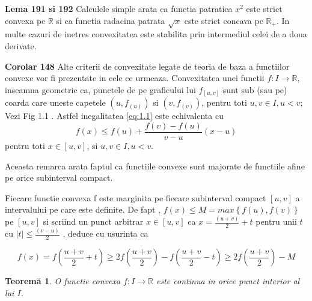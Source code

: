 \documentclass[a4paper,12pt,oneside]{report}
\newtheorem{theorem}{Teorem\u a}
\begin{document}
\textbf{Lema 191 si 192} 
Calculele simple arata ca functia patratica \(x^{2}\) este strict convexa pe \(\mathbb{R}\) si ca functia radacina patrata \(\sqrt{x}\) este strict concava pe \(\mathbb{R}_{+}\). In multe cazuri de inetres convexitatea este stabilita prin intermediul celei de a doua derivate.

\textbf{Corolar 148}
Alte criterii de convexitate legate de teoria de baza a functiilor convexe vor fi prezentate in cele ce urmeaza. 
Convexitatea unei functii \(f : I\rightarrow \mathbb{R}\), inseamna geometric ca, punctele de pe graficului lui \(f_{\left [ u,v \right ]}\) sunt sub (sau pe) coarda care uneste capetele \(\left ( u , f_{\left ( u \right )} \right )\)  si \(\left ( v , f_{\left ( v \right )} \right )\), pentru toti \(u, v \in I, u < v\); 
Vezi Fig 1.1 . Astfel inegalitatea \ref{eq:1.1} este echivalenta cu 
\begin{displaymath}
	f\left ( x \right )\leq f\left ( u \right ) +\frac{f\left ( v \right )- f\left ( u \right )}{v - u}\left ( x - u \right ) \label{eq:1.2} \tag{1.2}
\end{displaymath}
pentru toti \(x\in \left [  u, v\right ]\), si \(u, v \in I, u < v\). 

%
%
%
%

Aceasta remarca arata faptul ca functiile convexe sunt majorate de functiile afine pe orice subinterval compact. 

Fiecare functie convexa f este marginita pe fiecare subinterval compact \(\left [ u , v \right ]\) a intervalului pe care este definite. De fapt , \(f\left ( x \right ) \leq  M = max \left \{ f\left ( u \right ), f\left ( v \right ) \right \}\)  pe \(\left [ u , v \right ]\)  si scriind un punct arbitrar \(x\in  \left [ u , v  \right ]\)  ca  \(x= \frac{\left ( u + v \right )}{2} + t\) pentru unii \(t\) cu \(\left | t \right |\leq \frac{\left ( v - u \right )}{2}\) , deduce cu usurinta ca 

\begin{displaymath}
  f\left ( x \right )=  f\left ( \frac{u+v}{2} + t\right )\geq 2 f\left ( \frac{u + v}{2} \right )- f\left ( \frac{u + v}{2} - t\right )\geq 2f\left ( \frac{u+v}{2} \right ) - M
\end{displaymath}

\begin{theorem}
	O functie convexa \(f: I \rightarrow \mathbb{R}\) este continua in orice punct interior al lui \(I\). 
\end{theorem}
\end{document}
